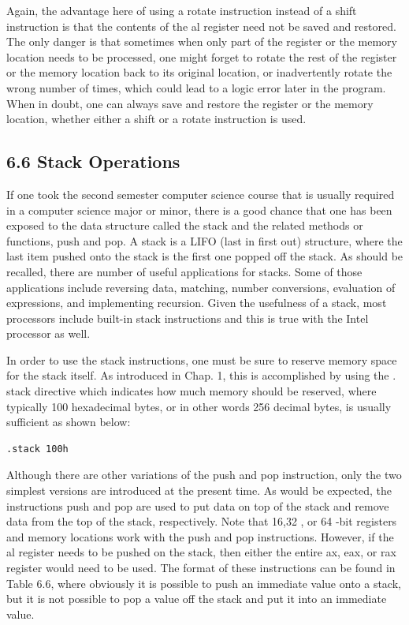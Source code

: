 \documentclass[10pt]{article}
\begin{document}
Again, the advantage here of using a rotate instruction instead of a shift instruction is that the contents of the al register need not be saved and restored. The only danger is that sometimes when only part of the register or the memory location needs to be processed, one might forget to rotate the rest of the register or the memory location back to its original location, or inadvertently rotate the wrong number of times, which could lead to a logic error later in the program. When in doubt, one can always save and restore the register or the memory location, whether either a shift or a rotate instruction is used.

\subsection*{6.6 Stack Operations}
If one took the second semester computer science course that is usually required in a computer science major or minor, there is a good chance that one has been exposed to the data structure called the stack and the related methods or functions, push and pop. A stack is a LIFO (last in first out) structure, where the last item pushed onto the stack is the first one popped off the stack. As should be recalled, there are number of useful applications for stacks. Some of those applications include reversing data, matching, number conversions, evaluation of expressions, and implementing recursion. Given the usefulness of a stack, most processors include built-in stack instructions and this is true with the Intel processor as well.

In order to use the stack instructions, one must be sure to reserve memory space for the stack itself. As introduced in Chap. 1, this is accomplished by using the . stack directive which indicates how much memory should be reserved, where typically 100 hexadecimal bytes, or in other words 256 decimal bytes, is usually sufficient as shown below:

\begin{verbatim}
.stack 100h
\end{verbatim}

Although there are other variations of the push and pop instruction, only the two simplest versions are introduced at the present time. As would be expected, the instructions push and pop are used to put data on top of the stack and remove data from the top of the stack, respectively. Note that 16,32 , or 64 -bit registers and memory locations work with the push and pop instructions. However, if the al register needs to be pushed on the stack, then either the entire ax, eax, or rax register would need to be used. The format of these instructions can be found in Table 6.6, where obviously it is possible to push an immediate value onto a stack, but it is not possible to pop a value off the stack and put it into an immediate value.
\end{document}
